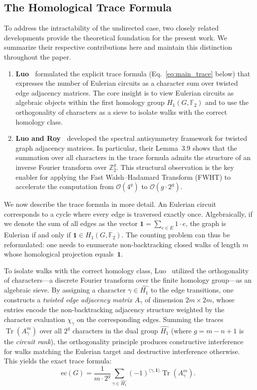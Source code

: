 \documentclass[acmsmall,review]{acmart}
\newcommand{\ec}{\text{ec}}
\newcommand{\onevec}{\mathbf{1}}
\newcommand{\bigO}{\mathcal{O}}
\newcommand{\F}{\mathbb{F}_2}
\DeclareMathOperator{\Tr}{Tr}
\begin{document}
	\subsection{The Homological Trace Formula}
	\label{sec:homological_perspective}
	To address the intractability of the undirected case, two closely related developments provide the theoretical foundation for the present work. We summarize their respective contributions here and maintain this distinction throughout the paper.
	
	\begin{enumerate}
		\item \textbf{Luo~\cite{Luo2025}} formulated the explicit trace formula (Eq.~\eqref{eq:main_trace} below) that expresses the number of Eulerian circuits as a character sum over twisted edge adjacency matrices. The core insight is to view Eulerian circuits as algebraic objects within the first homology group $H_1(G, \F)$ and to use the orthogonality of characters as a sieve to isolate walks with the correct homology class.
		\item \textbf{Luo and Roy~\cite{LR24}} developed the spectral antisymmetry framework for twisted graph adjacency matrices. In particular, their Lemma~3.9 shows that the summation over all characters in the trace formula admits the structure of an inverse Fourier transform over $\mathbb{Z}_2^g$. This structural observation is the key enabler for applying the Fast Walsh--Hadamard Transform (FWHT) to accelerate the computation from $\bigO(4^g)$ to $\bigO(g \cdot 2^g)$.
	\end{enumerate}
	
	We now describe the trace formula in more detail. An Eulerian circuit corresponds to a cycle where every edge is traversed exactly once. Algebraically, if we denote the sum of all edges as the vector $\onevec = \sum_{e \in E} 1 \cdot e$, the graph is Eulerian if and only if $\onevec \in H_1(G, \F)$. The counting problem can thus be reformulated: one needs to enumerate non-backtracking closed walks of length $m$ whose homological projection equals~$\onevec$.
	
	To isolate walks with the correct homology class, Luo~\cite{Luo2025} utilized the orthogonality of characters---a discrete Fourier transform over the finite homology group---as an algebraic sieve. By assigning a character $\gamma \in \widehat{H_1}$ to the edge transitions, one constructs a \emph{twisted edge adjacency matrix} $A_{\gamma}$ of dimension $2m \times 2m$, whose entries encode the non-backtracking adjacency structure weighted by the character evaluation $\chi_\gamma$ on the corresponding edges. Summing the traces $\Tr(A_{\gamma}^m)$ over all $2^g$ characters in the dual group $\widehat{H_1}$ (where $g = m - n + 1$ is the \emph{circuit rank}), the orthogonality principle produces constructive interference for walks matching the Eulerian target and destructive interference otherwise. This yields the exact trace formula:
	\begin{equation}\label{eq:main_trace}
		\ec(G) = \frac{1}{m \cdot 2^g} \sum_{\gamma \in \widehat{H_1}} (-1)^{\langle \gamma, \onevec \rangle} \Tr(A_{\gamma}^m).
	\end{equation}
	
\end{document}
